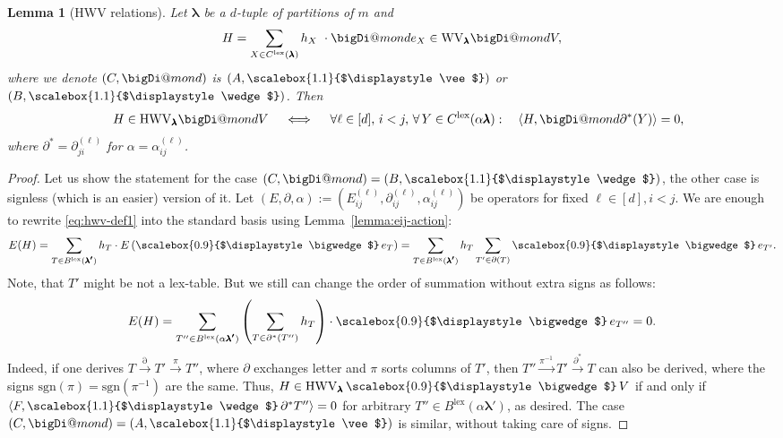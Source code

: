 \documentclass[12pt, reqno]{amsart}
\makeatletter
\newtheorem{lemma}[theorem]{Lemma}
\theoremstyle{definition}
\newcommand{\sgn}{\mathrm{sgn}}
\let\oldbigwedge\bigwedge
\let\oldwedge\wedge
\let\oldvee\vee
\renewcommand{\bigwedge}{
  \mathop{
    \vcenter{
      \hbox{\scalebox{0.9}{$\displaystyle\oldbigwedge$}}
    }
  }
}
\renewcommand{\wedge}{
  \mathop{
    \vcenter{
      \hbox{\scalebox{1.1}{$\displaystyle\oldwedge$}}
    }
  }
}
\renewcommand{\vee}{
  \mathop{
    \vcenter{
      \hbox{\scalebox{1.1}{$\displaystyle\oldvee$}}
    }
  }
}
\newcommand\bigDiamond{\mathop{\mathpalette\bigDi@mond\relax}}
\newcommand\bigDi@mond[2]{%
  \vcenter{\hbox{\m@th
    \scalebox{\ifx#1\displaystyle 2\else1.2\fi}{$#1\Diamond$}%
  }}%
}
\makeatother
\begin{document}
\vspace{0.5em}




\begin{lemma}[HWV relations]\label{lemma:raising1}
    Let $\pmb{\lambda}$ be a $d$-tuple of partitions of $m$ and 
    $$
        H = \sum_{X \in C^{\mathrm{lex}}(\pmb{\lambda})} h_X\  \cdot {\textstyle\bigDiamond} e_X \in \mathrm{WV}_{\pmb{\lambda}} {\textstyle\bigDiamond} V, %
    $$ 
    where we denote $(C, {\textstyle\bigDiamond})$ is $(A, \vee)$ or $(B, \wedge)$. Then
    $$
        \quad H \in \mathrm{HWV}_{\pmb{\lambda}} {\textstyle\bigDiamond} V \quad\iff\quad \forall \ell \in [d],\, i < j,\, \forall\, Y \in C^{\mathrm{lex}}(\alpha\pmb{\lambda}):\quad \left\langle H, {\textstyle\bigDiamond}\partial^*(Y) \right\rangle = 0,
    $$
    where $\partial^* = \partial^{(\ell)}_{j i}$ for $\alpha = \alpha^{(\ell)}_{i j}$. 
\end{lemma}

\begin{proof}
    Let us show the statement for the case $(C, {\textstyle\bigDiamond}) = (B, \wedge)$, the other case is signless (which is an easier) version of it. Let $(E, \partial, \alpha) := (E^{(\ell)}_{i j}, \partial^{(\ell)}_{ij}, \alpha^{(\ell)}_{ij})$ be operators for fixed $\ell \in [d], i < j$.
    We are enough to rewrite \eqref{eq:hwv-def1} into the standard basis using Lemma~\ref{lemma:eij-action}:
    \begin{align*}
        E(H) 
        = \sum_{T \in B^{\mathrm{lex}}(\pmb{\lambda'})} h_T \cdot E\left(\bigwedge e_T\right)
        = \sum_{T \in B^{\mathrm{lex}}(\pmb{\lambda'})} h_T 
            \sum_{T' \in \partial(T)} \bigwedge e_{T'}.
    \end{align*}
    Note, that $T'$ might be not a lex-table. But we still can change the order of summation without extra signs as follows: 
    $$
        E(H) = 
        \sum_{T'' \in B^{\mathrm{lex}}(\alpha\pmb{\lambda'})}\left(
            \sum_{T \in \partial^*(T'')} h_T
        \right) \cdot \bigwedge e_{T''} = 0.
    $$
    Indeed, if one derives $T \xrightarrow{\partial} T' \xrightarrow{\pi} T''$, where $\partial$ exchanges letter and $\pi$ sorts columns of $T'$, 
    then $T'' \xrightarrow{\pi^{-1}} T' \xrightarrow{\partial^*} T$ can also be derived, where the signs $\sgn(\pi) = \sgn(\pi^{-1})$ are the same. Thus, $H \in \mathrm{HWV}_{\pmb{\lambda}} \bigwedge V$ if and only if $\langle F, \wedge \partial^* T'' \rangle = 0$ for arbitrary $T'' \in B^{\mathrm{lex}}(\alpha\pmb{\lambda'})$, as desired. The case $(C,{\textstyle\bigDiamond}) = (A, \vee)$ is similar, without taking care of signs.
\end{proof}
\end{document}
